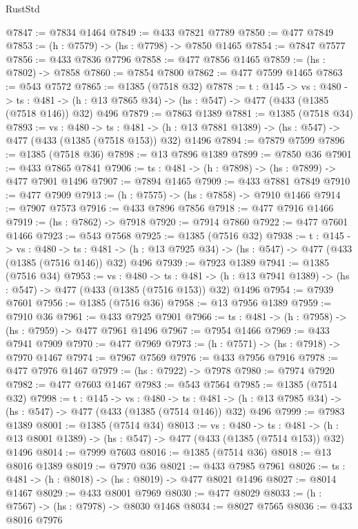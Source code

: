 \begin{lexlean}{RustStd}
\begin{coremodule}
{\begin{coremodule}
{{{{{{{{{{{{{{{{@7847 := @7834 @1464
@7849 := @433 @7821 @7789
@7850 := @477 @7849
@7853 := (h : @7579) -> (hs : @7798) -> @7850 @1465
@7854 := @7847 @7577
@7856 := @433 @7836 @7796
@7858 := @477 @7856 @1465
@7859 := (hs : @7802) -> @7858
@7860 := @7854 @7800
@7862 := @477 @7599 @1465
@7863 := @543 @7572
@7865 := @1385 (@7518 @32)
@7878 := {t : @145} ->
  {vs : @480} ->
  {ts : @481} -> (h : @13 @7865 @34) -> (hs : @547) -> @477 (@433 (@1385 (@7518 @146)) @32) @496
@7879 := @7863 @1389
@7881 := @1385 (@7518 @34)
@7893 := {vs : @480} ->
  {ts : @481} -> (h : @13 @7881 @1389) -> (hs : @547) -> @477 (@433 (@1385 (@7518 @153)) @32) @1496
@7894 := @7879 @7599
@7896 := @1385 (@7518 @36)
@7898 := @13 @7896 @1389
@7899 := @7850 @36
@7901 := @433 @7865 @7841
@7906 := {ts : @481} -> (h : @7898) -> (hs : @7899) -> @477 @7901 @1496
@7907 := @7894 @1465
@7909 := @433 @7881 @7849
@7910 := @477 @7909
@7913 := (h : @7575) -> (hs : @7858) -> @7910 @1466
@7914 := @7907 @7573
@7916 := @433 @7896 @7856
@7918 := @477 @7916 @1466
@7919 := (hs : @7862) -> @7918
@7920 := @7914 @7860
@7922 := @477 @7601 @1466
@7923 := @543 @7568
@7925 := @1385 (@7516 @32)
@7938 := {t : @145} ->
  {vs : @480} ->
  {ts : @481} -> (h : @13 @7925 @34) -> (hs : @547) -> @477 (@433 (@1385 (@7516 @146)) @32) @496
@7939 := @7923 @1389
@7941 := @1385 (@7516 @34)
@7953 := {vs : @480} ->
  {ts : @481} -> (h : @13 @7941 @1389) -> (hs : @547) -> @477 (@433 (@1385 (@7516 @153)) @32) @1496
@7954 := @7939 @7601
@7956 := @1385 (@7516 @36)
@7958 := @13 @7956 @1389
@7959 := @7910 @36
@7961 := @433 @7925 @7901
@7966 := {ts : @481} -> (h : @7958) -> (hs : @7959) -> @477 @7961 @1496
@7967 := @7954 @1466
@7969 := @433 @7941 @7909
@7970 := @477 @7969
@7973 := (h : @7571) -> (hs : @7918) -> @7970 @1467
@7974 := @7967 @7569
@7976 := @433 @7956 @7916
@7978 := @477 @7976 @1467
@7979 := (hs : @7922) -> @7978
@7980 := @7974 @7920
@7982 := @477 @7603 @1467
@7983 := @543 @7564
@7985 := @1385 (@7514 @32)
@7998 := {t : @145} ->
  {vs : @480} ->
  {ts : @481} -> (h : @13 @7985 @34) -> (hs : @547) -> @477 (@433 (@1385 (@7514 @146)) @32) @496
@7999 := @7983 @1389
@8001 := @1385 (@7514 @34)
@8013 := {vs : @480} ->
  {ts : @481} -> (h : @13 @8001 @1389) -> (hs : @547) -> @477 (@433 (@1385 (@7514 @153)) @32) @1496
@8014 := @7999 @7603
@8016 := @1385 (@7514 @36)
@8018 := @13 @8016 @1389
@8019 := @7970 @36
@8021 := @433 @7985 @7961
@8026 := {ts : @481} -> (h : @8018) -> (hs : @8019) -> @477 @8021 @1496
@8027 := @8014 @1467
@8029 := @433 @8001 @7969
@8030 := @477 @8029
@8033 := (h : @7567) -> (hs : @7978) -> @8030 @1468
@8034 := @8027 @7565
@8036 := @433 @8016 @7976
}}}}}}}}}}}}}}}}
\end{coremodule}}
\end{coremodule}
\end{lexlean}
